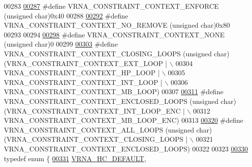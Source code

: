 \begin{DoxyCode}
00283 
\hyperlink{constraints__hard_8h_a1aa55f2c6347e670e003b1a765632dad}{00287} \textcolor{preprocessor}{#define VRNA\_CONSTRAINT\_CONTEXT\_ENFORCE       (unsigned char)0x40}
00288 
\hyperlink{constraints__hard_8h_a9fcac36535850ff612c7e6b1305304a1}{00292} \textcolor{preprocessor}{#define VRNA\_CONSTRAINT\_CONTEXT\_NO\_REMOVE     (unsigned char)0x80}
00293 
00294 
\hyperlink{constraints__hard_8h_addb99fd07ad9acc0201fd07eada8f661}{00298} \textcolor{preprocessor}{#define VRNA\_CONSTRAINT\_CONTEXT\_NONE          (unsigned char)0}
00299 
\hyperlink{constraints__hard_8h_a10675929fdc14c5f81df49d77933067a}{00303} \textcolor{preprocessor}{#define VRNA\_CONSTRAINT\_CONTEXT\_CLOSING\_LOOPS (unsigned char)(VRNA\_CONSTRAINT\_CONTEXT\_EXT\_LOOP | \(\backslash\)}
00304 \textcolor{preprocessor}{                                                              VRNA\_CONSTRAINT\_CONTEXT\_HP\_LOOP | \(\backslash\)}
00305 \textcolor{preprocessor}{                                                              VRNA\_CONSTRAINT\_CONTEXT\_INT\_LOOP | \(\backslash\)}
00306 \textcolor{preprocessor}{                                                              VRNA\_CONSTRAINT\_CONTEXT\_MB\_LOOP)}
00307 
\hyperlink{constraints__hard_8h_ae03ed6ba25cf3cefdf36516e4081eb17}{00311} \textcolor{preprocessor}{#define VRNA\_CONSTRAINT\_CONTEXT\_ENCLOSED\_LOOPS  (unsigned char)(VRNA\_CONSTRAINT\_CONTEXT\_INT\_LOOP\_ENC | \(\backslash\)}
00312 \textcolor{preprocessor}{                                                                VRNA\_CONSTRAINT\_CONTEXT\_MB\_LOOP\_ENC)}
00313 
\hyperlink{group__hard__constraints_ga886d9127c49bb982a4b67cd7581e8a5a}{00320} \textcolor{preprocessor}{#define VRNA\_CONSTRAINT\_CONTEXT\_ALL\_LOOPS     (unsigned char)(VRNA\_CONSTRAINT\_CONTEXT\_CLOSING\_LOOPS | \(\backslash\)}
00321 \textcolor{preprocessor}{                                                              VRNA\_CONSTRAINT\_CONTEXT\_ENCLOSED\_LOOPS)}
00322 
00323 
\hyperlink{constraints__hard_8h_a0fcb8bda9b3712e14f8f513def112435}{00330} \textcolor{keyword}{typedef} \textcolor{keyword}{enum} \{
\hyperlink{constraints__hard_8h_a0fcb8bda9b3712e14f8f513def112435a030a42722f849b10dd5780ceed7dfedd}{00331}   \hyperlink{constraints__hard_8h_a0fcb8bda9b3712e14f8f513def112435a030a42722f849b10dd5780ceed7dfedd}{VRNA\_HC\_DEFAULT},  

\end{DoxyCode}
